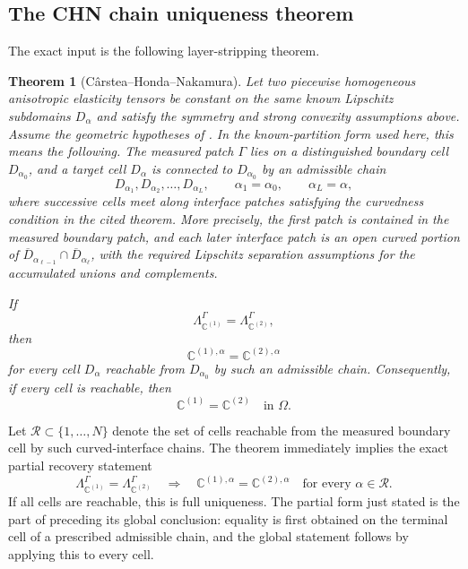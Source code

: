 \documentclass[12pt,oneside]{amsart}
\newtheorem{theorem}{Theorem}[section]
\newcommand{\cR}{\mathcal R}
\begin{document}
\subsection{The CHN chain uniqueness theorem}\label{subsec:elastic-uniqueness}

The exact input is the following layer-stripping theorem.


\begin{theorem}[C\^arstea--Honda--Nakamura]\label{thm:CHN-chain}
Let two piecewise homogeneous anisotropic elasticity tensors be constant on the
same known Lipschitz subdomains $D_\alpha$ and satisfy the symmetry and strong
convexity assumptions above.  Assume the geometric hypotheses of
\cite[Theorem 2.1]{CarsteaHondaNakamura2018}.  In the known-partition form used
here, this means the following.  The measured patch $\Gamma$ lies on a
distinguished boundary cell $D_{\alpha_0}$, and a target cell $D_\alpha$ is
connected to $D_{\alpha_0}$ by an admissible chain
\[
        D_{\alpha_1},D_{\alpha_2},\ldots,D_{\alpha_L},
        \qquad
        \alpha_1=\alpha_0,
        \qquad
        \alpha_L=\alpha,
\]
where successive cells meet along interface patches satisfying the curvedness
condition in the cited theorem.  More precisely, the first patch is contained in the measured
boundary patch, and each later interface patch is an open curved portion of
$\overline D_{\alpha_{\ell-1}}\cap\overline D_{\alpha_\ell}$, with the required
Lipschitz separation assumptions for the accumulated unions and complements.

If
\[
        \Lambda_{\mathbb C^{(1)}}^\Gamma
        =\Lambda_{\mathbb C^{(2)}}^\Gamma,
\]
then
\[
        \mathbb C^{(1),\alpha}
        =\mathbb C^{(2),\alpha}
\]
for every cell $D_\alpha$ reachable from $D_{\alpha_0}$ by such an admissible
chain.  Consequently, if every cell is reachable, then
\[
        \mathbb C^{(1)}=\mathbb C^{(2)}
        \quad\text{in }\Omega .
\]
\end{theorem}

Let $\cR\subset\{1,\ldots,N\}$ denote the set of cells reachable from the measured boundary cell by such curved-interface chains.  The theorem immediately implies the exact partial recovery statement
\[
        \Lambda_{\mathbb C^{(1)}}^\Gamma
        =\Lambda_{\mathbb C^{(2)}}^\Gamma
        \quad\Longrightarrow\quad
        \mathbb C^{(1),\alpha}=\mathbb C^{(2),\alpha}
        \quad\text{for every }\alpha\in\cR .
\]
If all cells are reachable, this is full uniqueness.  The partial form just stated is the part of \cite[Theorem 2.1]{CarsteaHondaNakamura2018} preceding its global conclusion: equality is first obtained on the terminal cell of a prescribed admissible chain, and the global statement follows by applying this to every cell.
\end{document}
